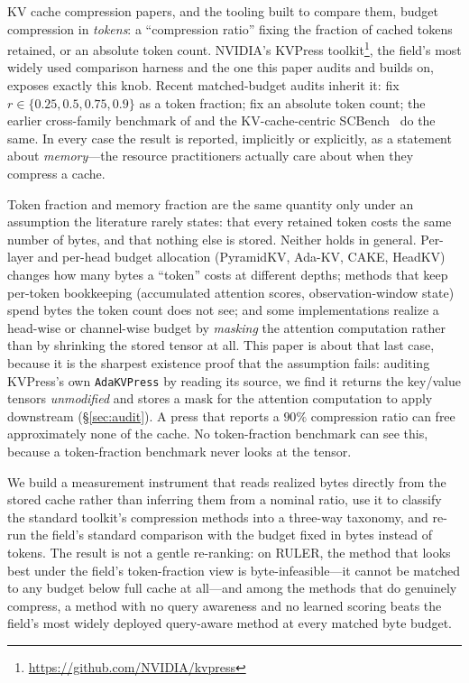 \documentclass[11pt]{article}
\begin{document}
KV cache compression papers, and the tooling built to compare them, budget compression in
\emph{tokens}: a ``compression ratio'' fixing the fraction of cached tokens retained, or an
absolute token count. NVIDIA's KVPress toolkit\footnote{\url{https://github.com/NVIDIA/kvpress}},
the field's most widely used comparison harness and the one this paper audits and builds on,
exposes exactly this knob. Recent matched-budget audits inherit it:
\citet{luo2026queryvisibility} fix $r \in \{0.25, 0.5, 0.75, 0.9\}$ as a token fraction;
\citet{garcia2026protection} fix an absolute token count; the earlier cross-family
benchmark of \citet{yuan2024longctxbench} and the KV-cache-centric SCBench~\citep{li2025scbench}
do the same. In every case the result is reported, implicitly or explicitly, as a statement about
\emph{memory}---the resource practitioners actually care about when they compress a cache.

Token fraction and memory fraction are the same quantity only under an assumption the literature
rarely states: that every retained token costs the same number of bytes, and that nothing else is
stored. Neither holds in general. Per-layer and per-head budget allocation (PyramidKV, Ada-KV,
CAKE, HeadKV) changes how many bytes a ``token'' costs at different depths; methods that keep
per-token bookkeeping (accumulated attention scores, observation-window state) spend bytes the
token count does not see; and some implementations realize a head-wise or channel-wise budget by
\emph{masking} the attention computation rather than by shrinking the stored tensor at all. This
paper is about that last case, because it is the sharpest existence proof that the assumption
fails: auditing KVPress's own \texttt{AdaKVPress} by reading its source, we find it returns the
key/value tensors \emph{unmodified} and stores a mask for the attention computation to apply
downstream (\S\ref{sec:audit}). A press that reports a $90\%$ compression ratio can free
approximately none of the cache. No token-fraction benchmark can see this, because a token-fraction
benchmark never looks at the tensor.

We build a measurement instrument that reads realized bytes directly from the stored cache rather
than inferring them from a nominal ratio, use it to classify the standard toolkit's compression
methods into a three-way taxonomy, and re-run the field's standard comparison with the budget fixed
in bytes instead of tokens. The result is not a gentle re-ranking: on RULER, the method that looks
best under the field's token-fraction view is byte-infeasible---it cannot be matched to any budget
below full cache at all---and among the methods that do genuinely compress, a method with no query
awareness and no learned scoring beats the field's most widely deployed query-aware method at every
matched byte budget.
\end{document}
